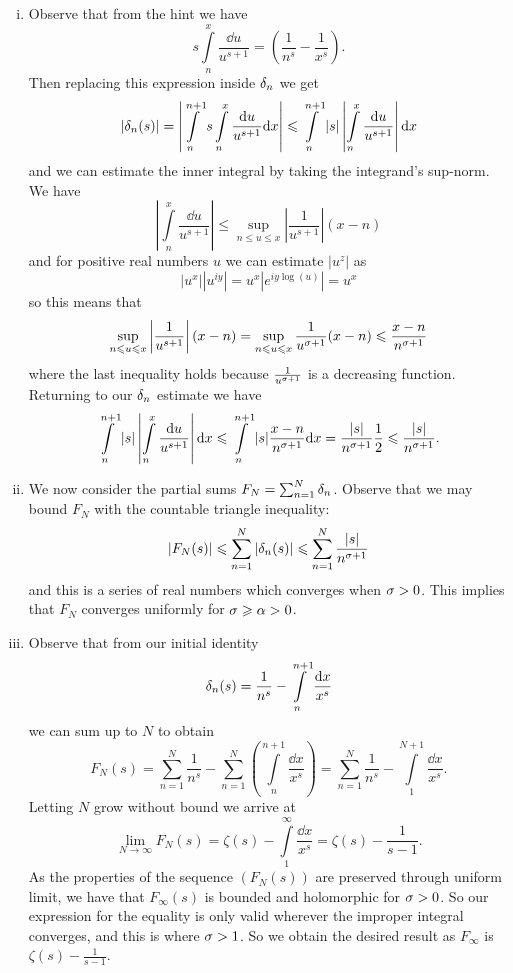 \documentclass[12pt]{memoir}
\begin{document}
\begin{ptcbr}
   \begin{enumerate}[i)]
      \itemsep=-0.4em
      \item Observe that from the hint we have 
      $$s\int\limits_n^x\frac{\dd u}{u^{s+1}}=\left(\frac{1}{n^s}-\frac{1}{x^s}\right).$$
      Then replacing this expression inside $\delta_n$ we get 
      $$ |\delta_n(s)|=\left|\int\limits_{n}^{n+1}s\int\limits_n^x\frac{\dd u}{u^{s+1}}\dd x\right|\leqslant \int\limits_{n}^{n+1}|s|\left|\int\limits_n^x\frac{\dd u}{u^{s+1}}\right|\dd x$$
      and we can estimate the inner integral by taking the integrand's sup-norm. We have 
      $$\left|\int\limits_n^x\frac{\dd u}{u^{s+1}}\right|\leq\sup_{n\leq u\leq x}\left|\frac{1}{u^{s+1}}\right|(x-n)$$
      and for positive real numbers $u$ we can estimate $|u^z|$ as 
      $$|u^x||u^{iy}|=u^x|e^{iy\log(u)}|=u^x$$ 
      so this means that 
      $$\sup_{n\leqslant u\leqslant x}\left|\frac{1}{u^{s+1}}\right|(x-n)=\sup_{n\leqslant u\leqslant x}\frac{1}{u^{\sigma+1}}(x-n)\leqslant\frac{x-n}{n^{\sigma+1}}$$
      where the last inequality holds because $\frac{1}{u^{\sigma+1}}$ is a decreasing function. Returning to our $\delta_n$ estimate we have
      $$\int\limits_{n}^{n+1}|s|\left|\int\limits_n^x\frac{\dd u}{u^{s+1}}\right|\dd x\leqslant \int\limits_{n}^{n+1}|s|\frac{x-n}{n^{\sigma+1}}\dd x=\frac{|s|}{n^{\sigma+1}}\frac{1}{2}\leqslant\frac{|s|}{n^{\sigma+1}}.$$
      \item We now consider the partial sums $F_N=\sum_{n=1}^{N}\delta_n$. Observe that we may bound $F_N$ with the countable triangle inequality:
      $$|F_N(s)|\leqslant \sum_{n=1}^{N}|\delta_n(s)|\leqslant\sum_{n=1}^{N}\frac{|s|}{n^{\sigma+1}}$$
      and this is a series of real numbers which converges when $\sigma>0$. This implies that $F_N$ converges uniformly for $\sigma\geqslant\alpha>0$.
      \item Observe that from our initial identity 
      $$\delta_n(s)=\frac{1}{n^s}-\int\limits_n^{n+1}\frac{\dd x}{x^s}$$
      we can sum up to $N$ to obtain
      $$F_N(s)=\sum_{n=1}^{N}\frac{1}{n^s}-\sum_{n=1}^{N}\left(\int\limits_n^{n+1}\frac{\dd x}{x^s}\right)=\sum_{n=1}^{N}\frac{1}{n^s}-\int\limits_{1}^{N+1}\frac{\dd x}{x^s}.$$
      Letting $N$ grow without bound we arrive at 
      $$\lim_{N\to\infty}F_N(s)=\zeta(s)-\int\limits_1^{\infty}\frac{\dd x}{x^s}=\zeta(s)-\frac{1}{s-1}.$$
      As the properties of the sequence $(F_N(s))$ are preserved through uniform limit, we have that $F_\infty(s)$ is bounded and holomorphic for $\sigma>0$. So our expression for the equality is only valid wherever the improper integral converges, and this is where $\sigma>1$. So we obtain the desired result as $F_\infty$ is $\zeta(s)-\frac{1}{s-1}$.
   \end{enumerate}
\end{ptcbr}
\end{document}
